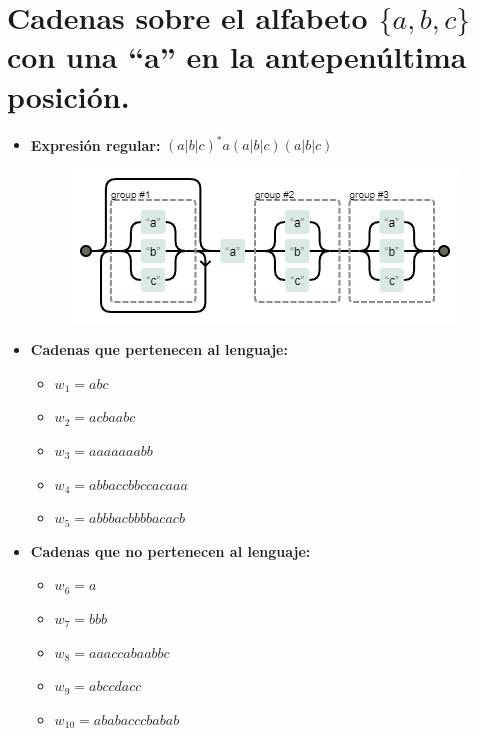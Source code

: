 \documentclass[11pt]{report}
\begin{document}
\section{Cadenas sobre el alfabeto \texorpdfstring{$\{a, b, c\}$}{\{a, b, c\}} con una “a” en la antepenúltima posición.}
\begin{itemize}
  \item \textbf{Expresión regular:} $(a|b|c)^*a(a|b|c)(a|b|c)$
    \begin{figure}[H]
      \centering
      \includegraphics[scale=0.9]{img/op_basicos_03.png}
    \end{figure}
  \item \textbf{Cadenas que pertenecen al lenguaje: }
    \begin{itemize}
      \item $w_1 = abc$
      \item $w_2 = acbaabc$
      \item $w_3 = aaaaaaabb$
      \item $w_4 = abbaccbbccacaaa$
      \item $w_5 = abbbacbbbbacacb$
    \end{itemize}
  \item \textbf{Cadenas que no pertenecen al lenguaje: }
    \begin{itemize}
      \item $w_6 = a$
      \item $w_7 = bbb$
      \item $w_8 = aaaccabaabbc$
      \item $w_9 = abccdacc$
      \item $w_{10} = ababacccbabab$
    \end{itemize}
\end{itemize}

\newpage
\end{document}
